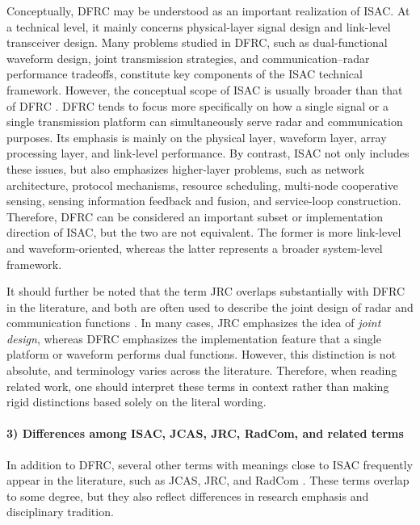 Conceptually, DFRC may be understood as an important realization of ISAC.
At a technical level, it mainly concerns physical-layer signal design and
link-level transceiver design.
Many problems studied in DFRC, such as dual-functional waveform design,
joint transmission strategies, and communication--radar performance tradeoffs,
constitute key components of the ISAC technical framework.
However, the conceptual scope of ISAC is usually broader than that of DFRC
\cite{Liu2022ISAC,Gonzalez2024integrated}.
DFRC tends to focus more specifically on how a single signal or a single
transmission platform can simultaneously serve radar and communication purposes.
Its emphasis is mainly on the physical layer, waveform layer, array processing
layer, and link-level performance.
By contrast, ISAC not only includes these issues, but also emphasizes
higher-layer problems, such as network architecture, protocol mechanisms,
resource scheduling, multi-node cooperative sensing, sensing information
feedback and fusion, and service-loop construction.
Therefore, DFRC can be considered an important subset or implementation
direction of ISAC, but the two are not equivalent.
The former is more link-level and waveform-oriented, whereas the latter
represents a broader system-level framework.

It should further be noted that the term JRC overlaps substantially with DFRC in the literature, and both are often used to describe the joint design of radar and communication functions \cite{Liu2020JointRadarComm,Zhang2021ISAC6G}. In many cases, JRC emphasizes the idea of \emph{joint design}, whereas DFRC emphasizes the implementation feature that a single platform or waveform performs dual functions. However, this distinction is not absolute, and terminology varies across the literature. Therefore, when reading related work, one should interpret these terms in context rather than making rigid distinctions based solely on the literal wording.

\paragraph{3) Differences among ISAC, JCAS, JRC, RadCom, and related terms}
\begin{sloppypar}
In addition to DFRC, several other terms with meanings close to ISAC frequently appear in the literature, such as JCAS, JRC, and RadCom \cite{Liu2022ISAC,Gonzalez2024integrated}. These terms overlap to some degree, but they also reflect differences in research emphasis and disciplinary tradition.
\end{sloppypar}

